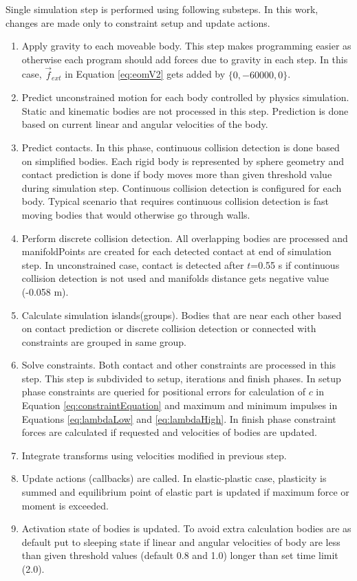 Single simulation step is performed using following substeps. 
In this work, changes are made only to constraint setup and update actions.
\begin{enumerate}
\item Apply gravity to each moveable body. 
This step makes programming easier as otherwise each program should add forces due to gravity in each step. 
In this case, $\vec{f}_{ext}$ in  Equation \ref{eq:eomV2} gets added by $\lbrace{0,-60000,0}\rbrace$.
\item Predict unconstrained motion for each body controlled by physics simulation.
Static and kinematic bodies are not processed in this step.
Prediction is done based on current linear and angular velocities of the body.
\item Predict contacts. In this phase, continuous collision detection is done based on simplified bodies. 
Each rigid body is represented by sphere geometry and contact prediction is done if body moves more than given threshold value during simulation step. Continuous collision detection is configured for each body. 
Typical scenario that requires continuous collision detection is fast moving bodies that would otherwise go through walls.
\item Perform discrete collision detection. All overlapping bodies are processed and manifoldPoints are created for
each detected contact at end of simulation step. 
In unconstrained case, contact is detected after $t$=0.55 s if continuous collision detection is not used and manifolds distance gets negative value (-0.058 m).
\item Calculate simulation islands(groups). Bodies that are near each other based on contact prediction or discrete collision detection
 or connected with constraints are grouped in same group.
\item Solve constraints. Both contact and other constraints are processed in this step. 
 This step is subdivided to setup, iterations and finish phases. 
In setup phase constraints are queried for positional errors for calculation of $c$ in
Equation \ref{eq:constraintEquation} and maximum and minimum impulses in Equations \ref{eq:lambdaLow} and 
\ref{eq:lambdaHigh}.
In finish phase constraint forces are calculated if requested and velocities of bodies are updated.
\item Integrate transforms using velocities modified in previous step.
\item Update actions (callbacks) are called. 
In elastic-plastic case, plasticity is summed and equilibrium point of elastic part is updated if maximum force or moment is exceeded.
\item Activation state of bodies is updated. 
To avoid extra calculation bodies are as default put to sleeping state if linear and angular velocities of body are less than
given threshold values (default 0.8 and 1.0) longer than set time limit (2.0).
\end{enumerate} 

